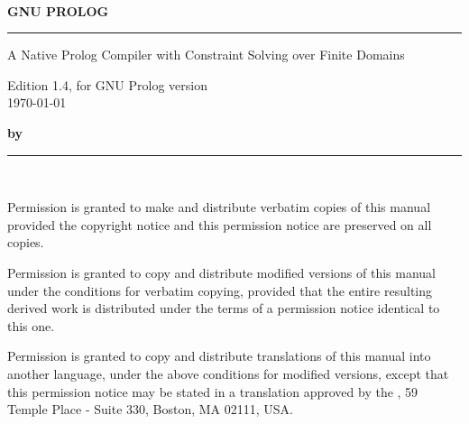 \pagestyle{empty}
\setlength{\parskip}{0pt}
~

\vspace{4cm}
{\huge\bf GNU PROLOG}
\vspace{3mm}

\rule[2mm]{\linewidth}{2mm}

\begin{flushright}
{\Large
A Native Prolog Compiler with Constraint Solving over Finite Domains

Edition 1.4, for GNU Prolog version \\

\today
}
\end{flushright}

\vspace{13cm}

{\Large\bf by }

\rule[2mm]{\linewidth}{1mm}

\newpage
~

\vspace{17cm}

\setlength{\parskip}{\saveparskip}



Permission is granted to make and distribute verbatim copies of this manual
provided the copyright notice and this permission notice are preserved on all
copies.

Permission is granted to copy and distribute modified versions of this manual
under the conditions for verbatim copying, provided that the entire resulting
derived work is distributed under the terms of a permission notice identical
to this one.

Permission is granted to copy and distribute translations of this manual into
another language, under the above conditions for modified versions, except
that this permission notice may be stated in a translation approved by the
, 59 Temple Place - Suite 330, Boston, MA 02111, USA.


\newpage
\pagestyle{fancy}
\setcounter{page}{1}

